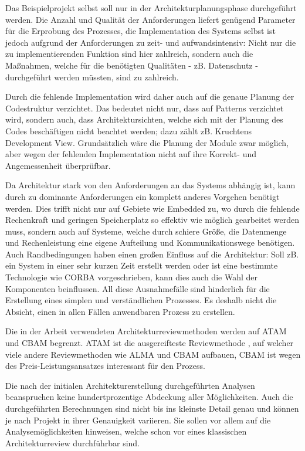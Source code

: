 Das Beispielprojekt selbst soll nur in der Architekturplanungsphase durchgeführt werden. Die Anzahl und Qualität der Anforderungen liefert genügend Parameter für die Erprobung des Prozesses, die Implementation des Systems selbst ist jedoch aufgrund der Anforderungen zu zeit- und aufwandsintensiv: Nicht nur die zu implementierenden Funktion sind hier zahlreich, sondern auch die Maßnahmen, welche für die benötigten Qualitäten - zB. Datenschutz - durchgeführt werden müssten, sind zu zahlreich.

Durch die fehlende Implementation wird daher auch auf die genaue Planung der Codestruktur verzichtet. Das bedeutet nicht nur, dass auf Patterns verzichtet wird, sondern auch, dass Architektursichten, welche sich mit der Planung des Codes beschäftigen nicht beachtet werden; dazu zählt zB. Kruchtens Development View. Grundsätzlich wäre die Planung der Module zwar möglich, aber wegen der fehlenden Implementation nicht auf ihre Korrekt- und Angemessenheit überprüfbar.

Da Architektur stark von den Anforderungen an das Systems abhängig ist, kann durch zu dominante Anforderungen ein komplett anderes Vorgehen benötigt werden. Dies trifft nicht nur auf Gebiete wie Embedded zu, wo durch die fehlende Rechenkraft und geringen Speicherplatz so effektiv wie möglich gearbeitet werden muss, sondern auch auf Systeme, welche durch schiere Größe, die Datenmenge und Rechenleistung eine eigene Aufteilung und Kommunikationswege benötigen. Auch Randbedingungen haben einen großen Einfluss auf die Architektur: Soll zB. ein System in einer sehr kurzen Zeit erstellt werden oder ist eine bestimmte Technologie wie CORBA vorgeschrieben, kann dies auch die Wahl der Komponenten beinflussen. All diese Ausnahmefälle sind hinderlich für die Erstellung eines simplen und verständlichen Prozesses. Es deshalb nicht die Absicht, einen in allen Fällen anwendbaren Prozess zu erstellen.

Die in der Arbeit verwendeten Architekturreviewmethoden werden auf ATAM und CBAM begrenzt. ATAM ist die ausgereifteste Reviewmethode \cite[S. 184]{basiswissen}, auf welcher viele andere Reviewmethoden wie ALMA und CBAM aufbauen, CBAM ist wegen des Preis-Leistungsansatzes interessant für den Prozess.

Die nach der initialen Architekturerstellung durchgeführten Analysen beanspruchen keine hundertprozentige Abdeckung aller Möglichkeiten. Auch die durchgeführten Berechnungen sind nicht bis ins kleinste Detail genau und können je nach Projekt in ihrer Genauigkeit variieren. Sie sollen vor allem auf die Analysemöglichkeiten hinweisen, welche schon vor eines klassischen Architekturreview durchführbar sind.

